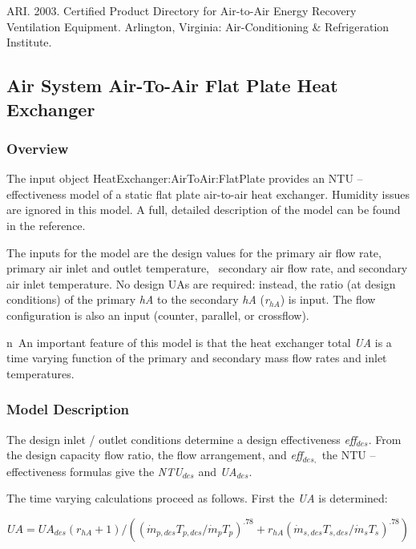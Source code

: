 ARI. 2003. Certified Product Directory for Air-to-Air Energy Recovery Ventilation Equipment. Arlington, Virginia: Air-Conditioning \& Refrigeration Institute.

\subsection{Air System Air-To-Air Flat Plate Heat Exchanger}\label{air-system-air-to-air-flat-plate-heat-exchanger}

\subsubsection{Overview}\label{overview-1-007}

The input object HeatExchanger:AirToAir:FlatPlate provides an NTU -- effectiveness model of a static flat plate air-to-air heat exchanger. Humidity issues are ignored in this model. A full, detailed description of the model can be found in the reference.

The inputs for the model are the design values for the primary air flow rate, primary air inlet and outlet temperature,~ secondary air flow rate, and secondary air inlet temperature. No design UAs are required: instead, the ratio (at design conditions) of the primary \emph{hA} to the secondary \emph{hA} (\emph{r\(_{hA}\)}) is input. The flow configuration is also an input (counter, parallel, or crossflow).

n~An important feature of this model is that the heat exchanger total \emph{UA} is a time varying function of the primary and secondary mass flow rates and inlet temperatures.

\subsubsection{Model Description}\label{model-description-1-007}

The design inlet / outlet conditions determine a design effectiveness \emph{eff}\(_{des}\). From the design capacity flow ratio, the flow arrangement, and \emph{eff}\(_{des,}\) the NTU -- effectiveness formulas give the \emph{NTU\(_{des}\)} and \emph{UA\(_{des}\)}.

The time varying calculations proceed as follows. First the \emph{UA} is determined:

\begin{equation}
UA = U{A_{des}}({r_{hA}} + 1)/({({\dot m_{p,des}}{T_{p,des}}/{\dot m_p}{T_p})^{.78}} + {r_{hA}}{({\dot m_{s,des}}{T_{s,des}}/{\dot m_s}{T_s})^{.78}})
\end{equation}

